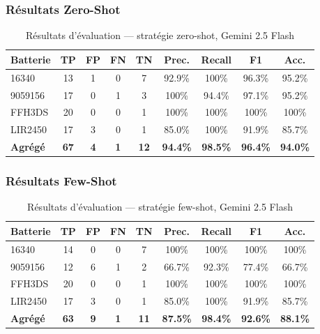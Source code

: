 \documentclass[12pt,a4paper]{article}
\begin{document}
\subsubsection{R\'esultats Zero-Shot}

\begin{table}[H]
\centering
\caption{R\'esultats d'\'evaluation --- strat\'egie zero-shot, Gemini 2.5 Flash}
\label{tab:eval-zs}
\begin{tabular}{lcccccccc}
\toprule
\textbf{Batterie} & \textbf{TP} & \textbf{FP} & \textbf{FN} & \textbf{TN} & \textbf{Prec.} & \textbf{Recall} & \textbf{F1} & \textbf{Acc.} \\
\midrule
16340 & 13 & 1 & 0 & 7 & 92.9\% & 100\% & 96.3\% & 95.2\% \\
9059156 & 17 & 0 & 1 & 3 & 100\% & 94.4\% & 97.1\% & 95.2\% \\
FFH3DS & 20 & 0 & 0 & 1 & 100\% & 100\% & 100\% & 100\% \\
LIR2450 & 17 & 3 & 0 & 1 & 85.0\% & 100\% & 91.9\% & 85.7\% \\
\midrule
\textbf{Agr\'eg\'e} & \textbf{67} & \textbf{4} & \textbf{1} & \textbf{12} & \textbf{94.4\%} & \textbf{98.5\%} & \textbf{96.4\%} & \textbf{94.0\%} \\
\bottomrule
\end{tabular}
\end{table}

\subsubsection{R\'esultats Few-Shot}

\begin{table}[H]
\centering
\caption{R\'esultats d'\'evaluation --- strat\'egie few-shot, Gemini 2.5 Flash}
\label{tab:eval-fs}
\begin{tabular}{lcccccccc}
\toprule
\textbf{Batterie} & \textbf{TP} & \textbf{FP} & \textbf{FN} & \textbf{TN} & \textbf{Prec.} & \textbf{Recall} & \textbf{F1} & \textbf{Acc.} \\
\midrule
16340 & 14 & 0 & 0 & 7 & 100\% & 100\% & 100\% & 100\% \\
9059156 & 12 & 6 & 1 & 2 & 66.7\% & 92.3\% & 77.4\% & 66.7\% \\
FFH3DS & 20 & 0 & 0 & 1 & 100\% & 100\% & 100\% & 100\% \\
LIR2450 & 17 & 3 & 0 & 1 & 85.0\% & 100\% & 91.9\% & 85.7\% \\
\midrule
\textbf{Agr\'eg\'e} & \textbf{63} & \textbf{9} & \textbf{1} & \textbf{11} & \textbf{87.5\%} & \textbf{98.4\%} & \textbf{92.6\%} & \textbf{88.1\%} \\
\bottomrule
\end{tabular}
\end{table}
\end{document}
